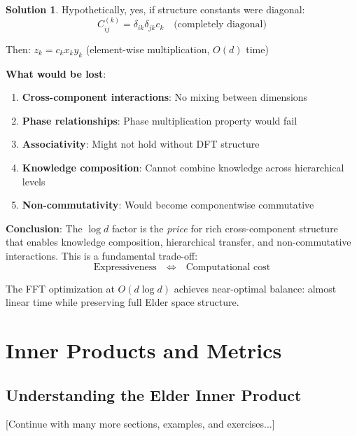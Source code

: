 \documentclass[12pt,a4paper]{book}
\theoremstyle{definition}
\newtheorem{solution}{Solution}[section]
\theoremstyle{remark}
\begin{document}
\begin{solution}
Hypothetically, yes, if structure constants were diagonal:
$$C_{ij}^{(k)} = \delta_{ik}\delta_{jk} c_k \quad \text{(completely diagonal)}$$

Then: $z_k = c_k x_k y_k$ (element-wise multiplication, $O(d)$ time)

\textbf{What would be lost}:
\begin{enumerate}
\item \textbf{Cross-component interactions}: No mixing between dimensions
\item \textbf{Phase relationships}: Phase multiplication property would fail
\item \textbf{Associativity}: Might not hold without DFT structure
\item \textbf{Knowledge composition}: Cannot combine knowledge across hierarchical levels
\item \textbf{Non-commutativity}: Would become componentwise commutative
\end{enumerate}

\textbf{Conclusion}: The $\log d$ factor is the \textit{price} for rich cross-component structure that enables knowledge composition, hierarchical transfer, and non-commutative interactions. This is a fundamental trade-off:
$$\text{Expressiveness} \quad \Leftrightarrow \quad \text{Computational cost}$$

The FFT optimization at $O(d \log d)$ achieves near-optimal balance: almost linear time while preserving full Elder space structure.
\end{solution}

\chapter{Inner Products and Metrics}

\section{Understanding the Elder Inner Product}

[Continue with many more sections, examples, and exercises...]

\end{document}
